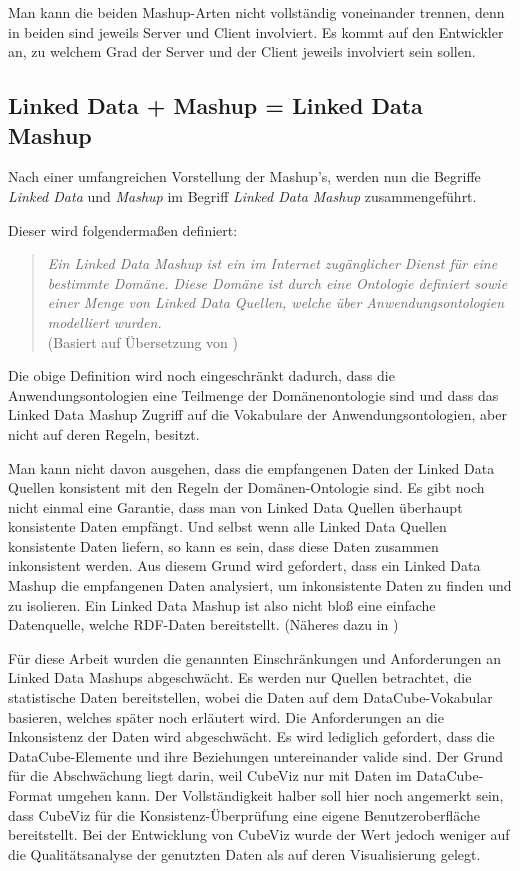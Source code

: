 \documentclass[11pt]{article}
\begin{document}
Man kann die beiden Mashup-Arten nicht vollständig voneinander trennen, denn in beiden sind jeweils Server und Client involviert. Es kommt auf den Entwickler an, zu welchem Grad der Server und der Client jeweils involviert sein sollen.


%
%
\subsection{Linked Data + Mashup = Linked Data Mashup}
\label{sec:chapterBasicsLinkedDataMashup}

Nach einer umfangreichen Vorstellung der Mashup's, werden nun die Begriffe \emph{Linked Data} und \emph{Mashup} im Begriff \emph{Linked Data Mashup} zusammengeführt. 


\newpage 
\noindent
Dieser wird folgendermaßen definiert: 

\begin{quote}
    \textit{Ein Linked Data Mashup ist ein im Internet zugänglicher Dienst für eine bestimmte Domäne. Diese Domäne ist durch eine Ontologie definiert sowie einer Menge von Linked Data Quellen, welche über Anwendungsontologien modelliert wurden.}\\(Basiert auf Übersetzung von \cite[S. 1]{MASHUP-LINKEDDATA})
\end{quote}

\noindent
Die obige Definition wird noch eingeschränkt dadurch, dass die Anwendungsontologien eine Teilmenge der Domänenontologie sind und dass das Linked Data Mashup Zugriff auf die Vokabulare der Anwendungsontologien, aber nicht auf deren Regeln, besitzt.

Man kann nicht davon ausgehen, dass die empfangenen Daten der Linked Data Quellen konsistent mit den Regeln der Domänen-Ontologie sind. Es gibt noch nicht einmal eine Garantie, dass man von Linked Data Quellen überhaupt konsistente Daten empfängt. Und selbst wenn alle Linked Data Quellen konsistente Daten liefern, so kann es sein, dass diese Daten zusammen inkonsistent werden. Aus diesem Grund wird gefordert, dass ein Linked Data Mashup die empfangenen Daten analysiert, um inkonsistente Daten zu finden und zu isolieren. Ein Linked Data Mashup ist also nicht bloß eine einfache Datenquelle, welche RDF-Daten bereitstellt. (Näheres dazu in \cite{MASHUP-LINKEDDATA})

Für diese Arbeit wurden die genannten Einschränkungen und Anforderungen an Linked Data Mashups abgeschwächt. Es werden nur Quellen betrachtet, die statistische Daten bereitstellen, wobei die Daten auf dem DataCube-Vokabular basieren, welches später noch erläutert wird. Die Anforderungen an die Inkonsistenz der Daten wird abgeschwächt. Es wird lediglich gefordert, dass die DataCube-Elemente und ihre Beziehungen untereinander valide sind. Der Grund für die Abschwächung liegt darin, weil CubeViz nur mit Daten im DataCube-Format umgehen kann. Der Vollständigkeit halber soll hier noch angemerkt sein, dass CubeViz für die Konsistenz-Überprüfung eine eigene Benutzeroberfläche bereitstellt. Bei der Entwicklung von CubeViz wurde der Wert jedoch weniger auf die Qualitätsanalyse der genutzten Daten als auf deren Visualisierung gelegt.
\end{document}
